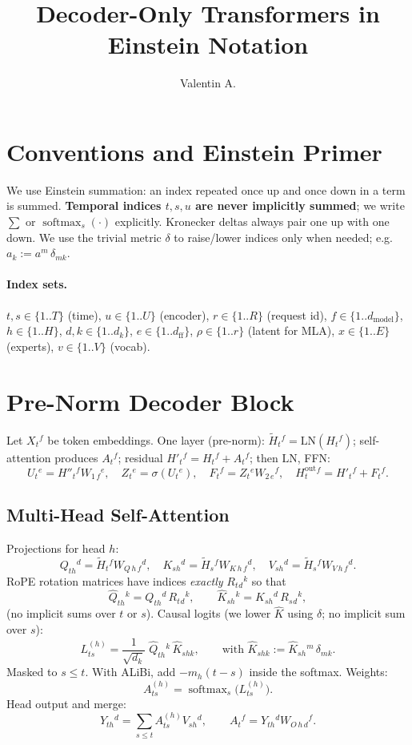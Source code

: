 \documentclass[11pt]{article}
\title{Decoder-Only Transformers in Einstein Notation}
\author{Valentin A.}
\date{}
\newcommand{\softmax}{\operatorname{softmax}}
\begin{document}
\maketitle

\section{Conventions and Einstein Primer}
We use Einstein summation: an index repeated once up and once down in a term is summed. \textbf{Temporal indices $t,s,u$ are never implicitly summed}; we write $\sum$ or $\softmax_s(\cdot)$ explicitly. Kronecker deltas always pair one up with one down. We use the trivial metric $\delta$ to raise/lower indices only when needed; e.g. $a_k := a^m\,\delta_{m k}$.

\paragraph{Index sets.} $t,s\in\{1..T\}$ (time), $u\in\{1..U\}$ (encoder), $r\in\{1..R\}$ (request id), $f\in\{1..d_{\mathrm{model}}\}$, $h\in\{1..H\}$, $d,k\in\{1..d_k\}$, $e\in\{1..d_{\mathrm{ff}}\}$, $\rho\in\{1..r\}$ (latent for MLA), $x\in\{1..E\}$ (experts), $v\in\{1..V\}$ (vocab).

\section{Pre-Norm Decoder Block}
Let $X_t{}^{f}$ be token embeddings. One layer (pre-norm): $\widetilde H_t{}^{f}=\mathrm{LN}(H_t{}^{f})$; self-attention produces $A_t{}^{f}$; residual $H'_t{}^{f}=H_t{}^{f}+A_t{}^{f}$; then $\mathrm{LN}$, FFN:
\[
U_t{}^{e}=H''_t{}^{f} W_{1\,f}{}^{e},\quad
Z_t{}^{e}=\sigma(U_t{}^{e}),\quad
F_t{}^{f}=Z_t{}^{e} W_{2\,e}{}^{f},\quad
H^{\mathrm{out}}_t{}^{f}=H'_t{}^{f}+F_t{}^{f}.
\]

\subsection{Multi-Head Self-Attention}
Projections for head $h$:
\[
Q_{t h}{}^{d}=\widetilde H_t{}^{f} W_{Q\,h\,f}{}^{d},\quad
K_{s h}{}^{d}=\widetilde H_s{}^{f} W_{K\,h\,f}{}^{d},\quad
V_{s h}{}^{d}=\widetilde H_s{}^{f} W_{V\,h\,f}{}^{d}.
\]
RoPE rotation matrices have indices \emph{exactly} $R_{t}{}_{d}{}^{k}$ so that
\[
\widehat Q_{t h}{}^{k}=Q_{t h}{}^{d}\, R_{t}{}_{d}{}^{k},\qquad
\widehat K_{s h}{}^{k}=K_{s h}{}^{d}\, R_{s}{}_{d}{}^{k},
\]
(no implicit sums over $t$ or $s$). Causal logits (we lower $\widehat K$ using $\delta$; no implicit sum over $s$):
\[
L_{t s}^{(h)}=\frac{1}{\sqrt{d_k}}\; \widehat Q_{t h}{}^{k}\, \widehat K_{s h k},\qquad \text{with } \widehat K_{s h k}:=\widehat K_{s h}{}^{m}\,\delta_{m k}.
\]
Masked to $s\le t$. With ALiBi, add $-m_h (t-s)$ inside the softmax. Weights:
\[
A_{t s}^{(h)}=\softmax_{s}\big(L_{t s}^{(h)}\big).
\]
Head output and merge:
\[
Y_{t h}{}^{d}=\sum_{s\le t} A_{t s}^{(h)} V_{s h}{}^{d},\qquad
A_t{}^{f}=Y_{t h}{}^{d} W_{O\,h\,d}{}^{f}.
\]
\end{document}
